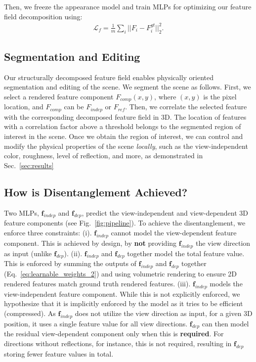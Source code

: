 \noindent Then, we freeze the appearance model and train MLPs for optimizing our feature field decomposition using: 
\begin{align}
\mathcal{L}_f = \frac{1}{m} \sum_i { || F_i - F^{gt}_i ||_2^2 }.
\label{eq:full_objective}
\end{align}


\subsection{Segmentation and Editing}
\label{sec:objectsegmentation}

Our structurally decomposed feature field enables physically oriented segmentation and editing of the scene. We segment the scene as follows. First, we select a rendered feature component $F_{comp}(x, y)$, where $(x, y)$ is the pixel location, and $F_{comp}$ can be $F_{indep}$ or $F_{ref}$. Then, we correlate the selected feature with the corresponding decomposed feature field in 3D. The location of features with a correlation factor above a threshold belongs to the segmented region of interest in the scene. Once we obtain the region of interest, we can control and modify the physical properties of the scene \textit{locally}, such as the view-independent color, roughness, level of reflection, and more, as demonstrated in Sec.~\ref{sec:results} %

\subsection{How is Disentanglement Achieved?}

Two MLPs, $\mathbf{f}_{indep}$ and $\mathbf{f}_{dep}$, predict the view-independent and view-dependent 3D feature components (see Fig.~\ref{fig:pipeline}). To achieve the disentanglement, we enforce three constraints: (i). $\mathbf{f}_{indep}$ cannot model the view-dependent feature component. This is achieved by design, by \textbf{not} providing $\mathbf{f}_{indep}$ the view direction as input (unlike $\mathbf{f}_{dep}$). (ii). $\mathbf{f}_{indep}$ and $\mathbf{f}_{dep}$ together model the total feature value. This is enforced by summing the outputs of $\mathbf{f}_{indep}$ and $\mathbf{f}_{dep}$ together (Eq.~\ref{eq:learnable_weights_2}) and using volumetric rendering to ensure 2D rendered features match ground truth rendered features. (iii). $\mathbf{f}_{indep}$ models the view-independent feature component. While this is not explicitly enforced, we hypothesize that it is implicitly enforced by the model as it tries to be efficient (compressed). As $\mathbf{f}_{indep}$ does not utilize the view direction as input, for a given 3D position, it uses a single feature value for all view directions. $\mathbf{f}_{dep}$ can then model the residual view-dependent component only when this is \textbf{required}. For directions without reflections, for instance, this is not required, resulting in $\mathbf{f}_{dep}$ storing fewer feature values in total.
